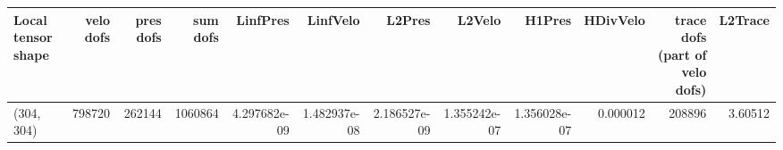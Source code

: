 \begin{tabular}{lrrrrrrrrrrr}
\toprule
Local tensor shape &  velo dofs &  pres dofs &  sum dofs &     LinfPres &     LinfVelo &       L2Pres &       L2Velo &       H1Pres &  HDivVelo &  trace dofs (part of velo dofs) &  L2Trace \\
\midrule
        (304, 304) &     798720 &     262144 &   1060864 & 4.297682e-09 & 1.482937e-08 & 2.186527e-09 & 1.355242e-07 & 1.356028e-07 &  0.000012 &                          208896 &  3.60512 \\
\bottomrule
\end{tabular}
